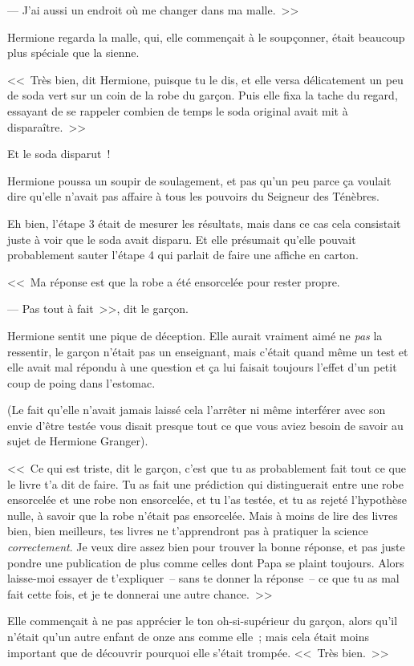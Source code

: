 --- J'ai aussi un endroit où me changer dans ma malle.~>>

Hermione regarda la malle, qui, elle commençait à le soupçonner, était beaucoup plus spéciale que la sienne.

<<~Très bien, dit Hermione, puisque tu le dis, et elle versa délicatement un peu de soda vert sur un coin de la robe du garçon. Puis elle fixa la tache du regard, essayant de se rappeler combien de temps le soda original avait mit à disparaître.~>>

Et le soda disparut~!

Hermione poussa un soupir de soulagement, et pas qu'un peu parce ça voulait dire qu'elle n'avait pas affaire à tous les pouvoirs du Seigneur des Ténèbres.

Eh bien, l'étape 3 était de mesurer les résultats, mais dans ce cas cela consistait juste à voir que le soda avait disparu. Et elle présumait qu'elle pouvait probablement sauter l'étape 4 qui parlait de faire une affiche en carton.

<<~Ma réponse est que la robe a été ensorcelée pour rester propre.

--- Pas tout à fait~>>, dit le garçon.

Hermione sentit une pique de déception. Elle aurait vraiment aimé ne \emph{pas} la ressentir, le garçon n'était pas un enseignant, mais c'était quand même un test et elle avait mal répondu à une question et ça lui faisait toujours l'effet d'un petit coup de poing dans l'estomac.

(Le fait qu'elle n'avait jamais laissé cela l'arrêter ni même interférer avec son envie d'être testée vous disait presque tout ce que vous aviez besoin de savoir au sujet de Hermione Granger).

<<~Ce qui est triste, dit le garçon, c'est que tu as probablement fait tout ce que le livre t'a dit de faire. Tu as fait une prédiction qui distinguerait entre une robe ensorcelée et une robe non ensorcelée, et tu l'as testée, et tu as rejeté l'hypothèse nulle, à savoir que la robe n'était pas ensorcelée. Mais à moins de lire des livres bien, bien meilleurs, tes livres ne t'apprendront pas à pratiquer la science \emph{correctement}. Je veux dire assez bien pour trouver la bonne réponse, et pas juste pondre une publication de plus comme celles dont Papa se plaint toujours. Alors laisse-moi essayer de t'expliquer~-- sans te donner la réponse~-- ce que tu as mal fait cette fois, et je te donnerai une autre chance.~>>

Elle commençait à ne pas apprécier le ton oh-si-supérieur du garçon, alors qu'il n'était qu'un autre enfant de onze ans comme elle~; mais cela était moins important que de découvrir pourquoi elle s'était trompée. <<~Très bien.~>>

